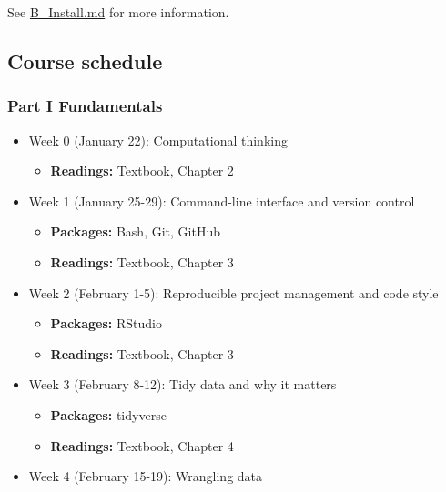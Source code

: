 \documentclass[
]{article}
\providecommand{\tightlist}{%
  \setlength{\itemsep}{0pt}\setlength{\parskip}{0pt}}
\begin{document}
See
\href{https://github.com/jaeyk/PS239T/blob/master/B_Install.md}{B\_Install.md}
for more information.

\hypertarget{course-schedule}{%
\subsection{Course schedule}\label{course-schedule}}

\hypertarget{part-i-fundamentals-1}{%
\subsubsection{Part I Fundamentals}\label{part-i-fundamentals-1}}

\begin{itemize}
\tightlist
\item
  Week 0 (January 22): Computational thinking

  \begin{itemize}
  \tightlist
  \item
    \textbf{Readings:} Textbook, Chapter 2
  \end{itemize}
\item
  Week 1 (January 25-29): Command-line interface and version control

  \begin{itemize}
  \tightlist
  \item
    \textbf{Packages:} Bash, Git, GitHub
  \item
    \textbf{Readings:} Textbook, Chapter 3
  \end{itemize}
\item
  Week 2 (February 1-5): Reproducible project management and code style

  \begin{itemize}
  \tightlist
  \item
    \textbf{Packages:} RStudio
  \item
    \textbf{Readings:} Textbook, Chapter 3
  \end{itemize}
\item
  Week 3 (February 8-12): Tidy data and why it matters

  \begin{itemize}
  \tightlist
  \item
    \textbf{Packages:} tidyverse
  \item
    \textbf{Readings:} Textbook, Chapter 4
  \end{itemize}
\item
  Week 4 (February 15-19): Wrangling data


\end{itemize}
\end{document}
